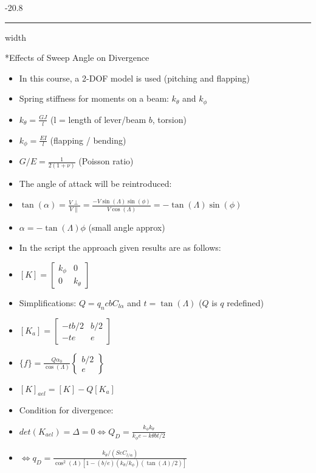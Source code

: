 \documentclass[8pt, landscape, fleqn]{scrartcl}
\makeatletter
\renewcommand{\subsubsection}{\@startsection{subsubsection}{1}{0mm}%
{-2\baselineskip}{0.8\baselineskip}%
{\hrule depth 0.2pt width\columnwidth\vspace*{1.2em}\normalsize\bfseries\rmfamily}}
\makeatother
\begin{document}
\begin{multicols*}{3}
\subsubsection*{Effects of Sweep Angle on Divergence}

\begin{itemize}
    \item In this course, a 2-DOF model is used (pitching and flapping)
    \item Spring stiffness for moments on a beam: $k_\theta$ and $k_\phi$
    \item $k_\theta = \frac{G J}{l}$ (l = length of lever/beam $b$, torsion)
    \item $k_\phi = \frac{E I}{l}$ (flapping / bending)
    \item $G/E = \frac{1}{2(1+\nu)}$ (Poisson ratio)
    \item The angle of attack will be reintroduced:
    \item $\tan(\alpha) = \frac{V\perp}{V\parallel} = \frac{-V \sin(\Lambda) \sin(\phi)}{V \cos(\Lambda)} = -\tan(\Lambda)\sin(\phi)$
    \item $\alpha = -\tan(\Lambda) \phi$ (small angle approx)
    \item In the script the approach given results are as follows:
    \item $[K] = \begin{bmatrix}
        k_\phi & 0 \\ 0 & k_\theta
    \end{bmatrix}$
    \item Simplifications: $Q = q_n c b C_{l\alpha}$ and $t = \tan(\Lambda)$ ($Q$ is $q$ redefined)
    \item $[K_a] = \begin{bmatrix}
        -tb/2 & b/2 \\ -te & e
    \end{bmatrix}$
    \item $\{f\} = \frac{Q \alpha_0}{\cos(\Lambda)} \begin{Bmatrix}
        b/2 \\ e
    \end{Bmatrix}$
    \item $[K]_{ael} = [K]-Q[K_a]$
    \item Condition for divergence:
    \item $det (K_{ael}) = \Delta = 0 \Leftrightarrow Q_D = \frac{k_\phi k_\theta}{k_\phi e - k\theta bt /2}$ 
    \item $\Leftrightarrow q_D = \frac{k_\theta / (Se C_{l/\alpha})}{\cos^2(\Lambda) [1-(b/e)(k_\theta/k_\phi)(\tan(\Lambda)/2)]}$

\end{itemize}
\end{multicols*}
\end{document}
